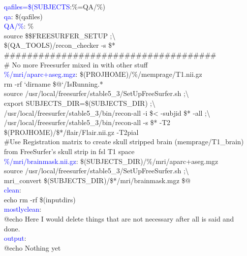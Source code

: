 \documentclass[oneside,11pt]{memoir}
\newcommand{\maker}[2]{\textcolor{blue}{#1}:\enspace#2}
\newcommand{\tab}{\hspace*{4em}}
\begin{document}
	\maker{qafiles=\$(SUBJECTS}{\%=QA/\%)} \\
	
	\maker{qa}{ \$(qafiles)} \\
	
	\maker{QA/\%}{ \%} \\
	\tab source \$\$FREESURFER_SETUP  ;\textbackslash \\
	\tab \$(QA_TOOLS)/recon_checker -s \$* \\
	
	\#\#\#\#\#\#\#\#\#\#\#\#\#\#\#\#\#\#\#\#\#\#\#\#\#\#\#\#\#\#\#\#\#\#\#\#\# \\
	
	\# No more Freesurfer mixed in with other stuff \\
	
	\maker{\%/mri/aparc+aseg.mgz}{ \$(PROJHOME)/\%/memprage/T1.nii.gz} \\
	\tab rm -rf `dirname \$@`/IsRunning.* \\
	\tab source /usr/local/freesurfer/stable5_3/SetUpFreeSurfer.sh  ;\textbackslash \\
	\tab export SUBJECTS_DIR=\$(SUBJECTS_DIR)  ;\textbackslash \\
	\tab /usr/local/freesurfer/stable5_3/bin/recon-all -i \$< -subjid \$* -all  ;\textbackslash \\
	\tab /usr/local/freesurfer/stable5_3/bin/recon-all -s \$* -T2 \$(PROJHOME)/\$*/flair/Flair.nii.gz -T2pial \\
	
	\#Use Registration matrix to create skull stripped brain (memprage/T1_brain) from FreeSurfer's skull strip in fsl T1 space \\
	
	\maker{\%/mri/brainmask.nii.gz}{ \$(SUBJECTS_DIR)/\%/mri/aparc+aseg.mgz} \\
	\tab source /usr/local/freesurfer/stable5_3/SetUpFreeSurfer.sh  ;\textbackslash \\
	\tab mri_convert \$(SUBJECTS_DIR)/\$*/mri/brainmask.mgz \$@ \\
	
	\maker{clean}{} \\
	\tab echo rm -rf \$(inputdirs) \\
	
	\maker{mostlyclean}{} \\
	\tab @echo Here I would delete things that are not necessary after all is said and done. \\
	
	\maker{output}{ } \\
	\tab @echo Nothing yet \\
	
\end{document}
